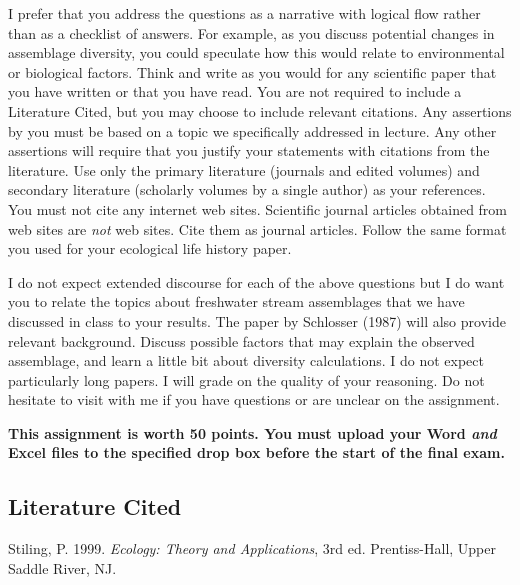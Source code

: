 \documentclass[11pt]{article}
\begin{document}
I prefer that you address the questions as a narrative with logical flow rather than as a checklist of answers.  For example, as you discuss potential changes in assemblage diversity, you could speculate how this would relate to environmental or biological factors.  Think and write as you would for any scientific paper that you have written or that you have read.  You are not required to include a Literature Cited, but you may choose to include relevant citations.  Any assertions by you must be based on a topic we specifically addressed in lecture.  Any other assertions will require that you justify your statements with citations from the literature.  Use only the primary literature (journals and edited volumes) and secondary literature (scholarly volumes by a single author) as your references.  You must not cite any internet web sites.  Scientific journal articles obtained from web sites are \emph{not} web sites. Cite them as journal articles. Follow the same format you used for your ecological life history paper.

I do not expect extended discourse for each of the above questions but I do want you to relate the topics about freshwater stream assemblages that we have discussed in class to your results.  The paper by Schlosser (1987) will also provide relevant background.  Discuss possible factors that may explain the observed assemblage, and learn a little bit about diversity calculations.  I do not expect particularly long papers.  I will  grade on the quality of your reasoning. Do not hesitate to visit with me if you have questions or are unclear on the assignment. 

\textbf{This assignment is worth 50 points. You must upload your Word \emph{and} Excel files to the specified drop box before the start of the final exam.}

\subsection*{Literature Cited}

Stiling, P. 1999. \textit{Ecology: Theory and Applications}, 3rd ed. Prentiss-Hall, Upper Saddle River, NJ.
\end{document}
